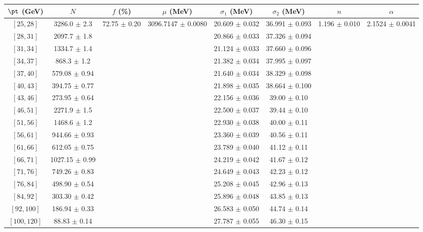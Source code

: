 \begin{tabular}{c||c|c|c|c|c|c|c}
$\pt$ (GeV) & $N$ & $f$ (\%) & $\mu$ (MeV) & $\sigma_1$ (MeV) & $\sigma_2$ (MeV) & $n$ & $\alpha$ \\
\hline
$[25, 28]$ & 3286.0 $\pm$ 2.3 & \multirow{17}{*}{72.75 $\pm$ 0.20} & \multirow{17}{*}{3096.7147 $\pm$ 0.0080} & 20.609 $\pm$ 0.032 & 36.991 $\pm$ 0.093 & \multirow{17}{*}{1.196 $\pm$ 0.010} & \multirow{17}{*}{2.1524 $\pm$ 0.0041}\\
$[28, 31]$ & 2097.7 $\pm$ 1.8 &  &  & 20.866 $\pm$ 0.033 & 37.326 $\pm$ 0.094 &  & \\
$[31, 34]$ & 1334.7 $\pm$ 1.4 &  &  & 21.124 $\pm$ 0.033 & 37.660 $\pm$ 0.096 &  & \\
$[34, 37]$ & 868.3 $\pm$ 1.2 &  &  & 21.382 $\pm$ 0.034 & 37.995 $\pm$ 0.097 &  & \\
$[37, 40]$ & 579.08 $\pm$ 0.94 &  &  & 21.640 $\pm$ 0.034 & 38.329 $\pm$ 0.098 &  & \\
$[40, 43]$ & 394.75 $\pm$ 0.77 &  &  & 21.898 $\pm$ 0.035 & 38.664 $\pm$ 0.100 &  & \\
$[43, 46]$ & 273.95 $\pm$ 0.64 &  &  & 22.156 $\pm$ 0.036 & 39.00 $\pm$ 0.10 &  & \\
$[46, 51]$ & 2271.9 $\pm$ 1.5 &  &  & 22.500 $\pm$ 0.037 & 39.44 $\pm$ 0.10 &  & \\
$[51, 56]$ & 1468.6 $\pm$ 1.2 &  &  & 22.930 $\pm$ 0.038 & 40.00 $\pm$ 0.11 &  & \\
$[56, 61]$ & 944.66 $\pm$ 0.93 &  &  & 23.360 $\pm$ 0.039 & 40.56 $\pm$ 0.11 &  & \\
$[61, 66]$ & 612.05 $\pm$ 0.75 &  &  & 23.789 $\pm$ 0.040 & 41.12 $\pm$ 0.11 &  & \\
$[66, 71]$ & 1027.15 $\pm$ 0.99 &  &  & 24.219 $\pm$ 0.042 & 41.67 $\pm$ 0.12 &  & \\
$[71, 76]$ & 749.26 $\pm$ 0.83 &  &  & 24.649 $\pm$ 0.043 & 42.23 $\pm$ 0.12 &  & \\
$[76, 84]$ & 498.90 $\pm$ 0.54 &  &  & 25.208 $\pm$ 0.045 & 42.96 $\pm$ 0.13 &  & \\
$[84, 92]$ & 303.30 $\pm$ 0.42 &  &  & 25.896 $\pm$ 0.048 & 43.85 $\pm$ 0.13 &  & \\
$[92, 100]$ & 186.94 $\pm$ 0.33 &  &  & 26.583 $\pm$ 0.050 & 44.74 $\pm$ 0.14 &  & \\
$[100, 120]$ & 88.83 $\pm$ 0.14 &  &  & 27.787 $\pm$ 0.055 & 46.30 $\pm$ 0.15 &  & \\
\end{tabular}
